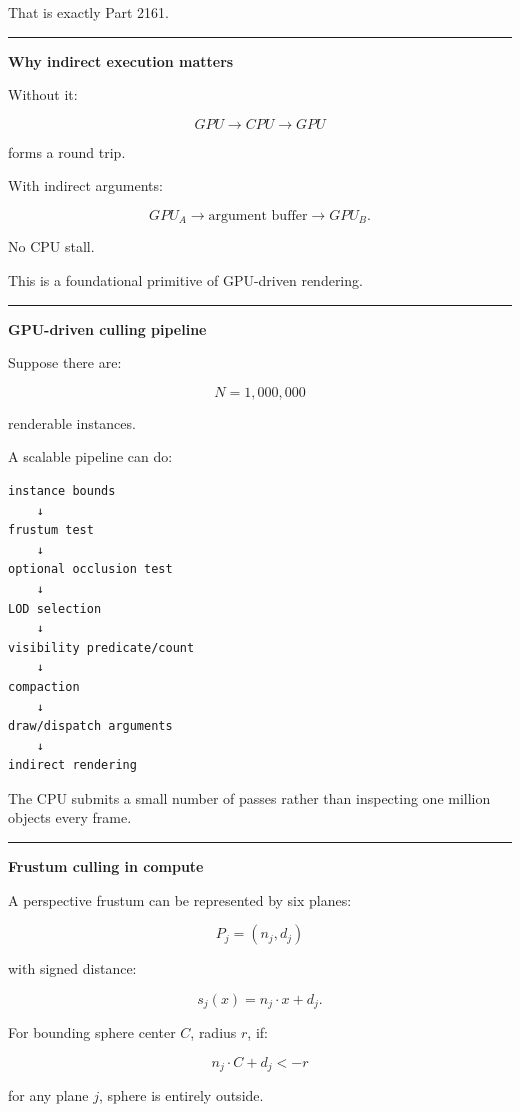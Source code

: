 That is exactly Part 2161.

\begin{center}\rule{0.5\linewidth}{0.5pt}\end{center}

\textbf{Why indirect execution matters}

Without it:

\[
GPU\rightarrow CPU\rightarrow GPU
\]

forms a round trip.

With indirect arguments:

\[
GPU_A
\rightarrow
\text{argument buffer}
\rightarrow
GPU_B.
\]

No CPU stall.

This is a foundational primitive of GPU-driven rendering.

\begin{center}\rule{0.5\linewidth}{0.5pt}\end{center}

\textbf{GPU-driven culling pipeline}

Suppose there are:

\[
N=1,000,000
\]

renderable instances.

A scalable pipeline can do:

\protect{}\label{p10-cull-pipeline}%
\begin{verbatim}
instance bounds
    ↓
frustum test
    ↓
optional occlusion test
    ↓
LOD selection
    ↓
visibility predicate/count
    ↓
compaction
    ↓
draw/dispatch arguments
    ↓
indirect rendering
\end{verbatim}

The CPU submits a small number of passes rather than inspecting one million objects every frame.

\begin{center}\rule{0.5\linewidth}{0.5pt}\end{center}

\textbf{Frustum culling in compute}

A perspective frustum can be represented by six planes:

\[
P_j=(n_j,d_j)
\]

with signed distance:

\[
s_j(x)
=
n_j\cdot x+d_j.
\]

For bounding sphere center \(C\), radius \(r\), if:

\[
n_j\cdot C+d_j<-r
\]

for any plane \(j\), sphere is entirely outside.

